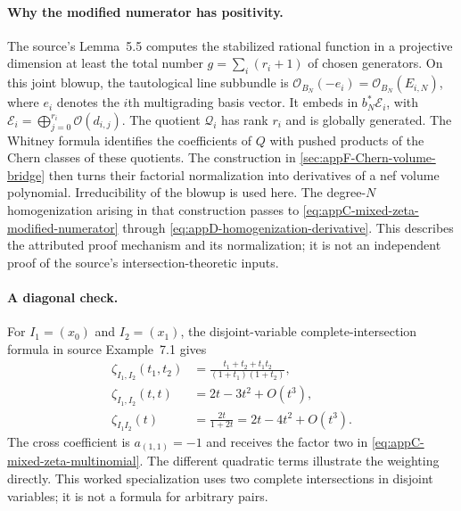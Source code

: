 \paragraph{Why the modified numerator has positivity.}
The source's Lemma~5.5 computes the stabilized rational function
in a projective dimension at least the total number
$g=\sum_i(r_i+1)$ of chosen generators. On this joint blowup,
the tautological line subbundle is
$\mathcal O_{B_N}(-e_i)=\mathcal O_{B_N}(E_{i,N})$,
where $e_i$ denotes the $i$th multigrading basis vector.
It embeds in
$b_N^*\mathcal E_i$, with
$\mathcal E_i=\bigoplus_{j=0}^{r_i}\mathcal O(d_{i,j})$.
The quotient $\mathcal Q_i$ has rank $r_i$ and is globally
generated. The Whitney formula identifies the coefficients of
$Q$ with pushed products of the Chern classes of these quotients.
The construction in \cref{sec:appF-Chern-volume-bridge} then
turns their factorial normalization into derivatives of a nef
volume polynomial. Irreducibility of the blowup is used here.
The degree-$N$ homogenization arising in that construction
passes to \eqref{eq:appC-mixed-zeta-modified-numerator} through
\eqref{eq:appD-homogenization-derivative}. This describes the
attributed proof mechanism and its normalization; it is not an
independent proof of the source's intersection-theoretic inputs.

\paragraph{A diagonal check.}
For $I_1=(x_0)$ and $I_2=(x_1)$, the disjoint-variable
complete-intersection formula in source Example~7.1 gives
\[
\begin{aligned}
 \zeta_{I_1,I_2}(t_1,t_2)
   &=\frac{t_1+t_2+t_1t_2}{(1+t_1)(1+t_2)},\\
 \zeta_{I_1,I_2}(t,t)&=2t-3t^2+O(t^3),\\
 \zeta_{I_1I_2}(t)&=\frac{2t}{1+2t}
                          =2t-4t^2+O(t^3).
\end{aligned}
\tag{C.41}\label{eq:appC-mixed-zeta-diagonal-check}
\]
The cross coefficient is $a_{(1,1)}=-1$ and receives the
factor two in \eqref{eq:appC-mixed-zeta-multinomial}.
The different quadratic terms illustrate the weighting directly.
This worked specialization uses two complete intersections in
disjoint variables; it is not a formula for arbitrary pairs.

